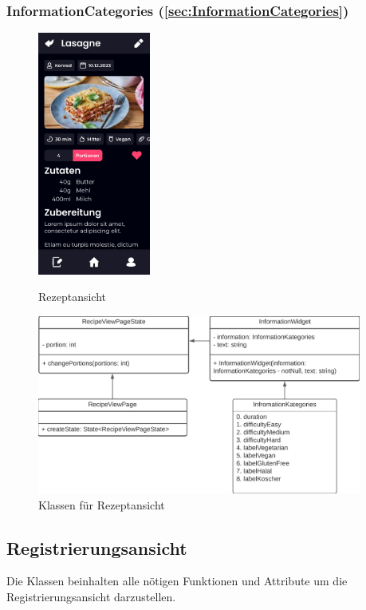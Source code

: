 \documentclass[parskip=full]{scrartcl}
\begin{document}
    \subsubsection{InformationCategories (\ref{sec:InformationCategories})}

    \begin{figure}[htp]
        \begin{minipage}
            [t]{0.49\textwidth}
            \centering
            \includegraphics[height=80mm]{images/Presentation-layer/RecipeView.jpg}
            \caption{Rezeptansicht}
        \end{minipage}
        \begin{minipage}
            [t]{0.49\textwidth}
            \centering
            \includegraphics[width=0.95\textwidth]{images/Presentation-layer/RecipeViewClass.png}
            \caption{Klassen für Rezeptansicht}
        \end{minipage}
    \end{figure}    

    \newpage

\subsection{Registrierungsansicht}
    Die Klassen beinhalten alle nötigen Funktionen und Attribute um die Registrierungsansicht darzustellen.
\end{document}

